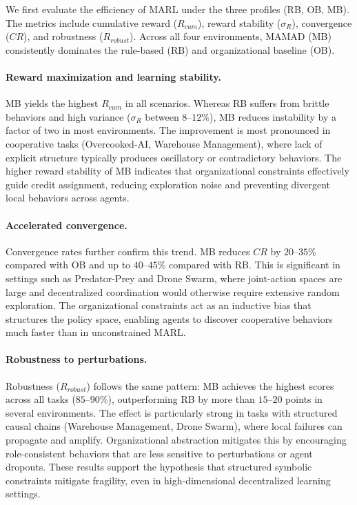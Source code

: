 \documentclass[pdflatex,sn-mathphys-num]{sn-jnl}%
\theoremstyle{thmstyleone}%
\theoremstyle{thmstyletwo}%
\theoremstyle{thmstylethree}%
\begin{document}
We first evaluate the efficiency of MARL under the three profiles (RB, OB, MB).
The metrics include cumulative reward ($R_{cum}$), reward stability ($\sigma_R$),
convergence ($CR$), and robustness ($R_{robust}$). Across all four environments,
MAMAD (MB) consistently dominates the rule-based (RB) and organizational baseline
(OB).

\paragraph*{Reward maximization and learning stability.}
MB yields the highest $R_{cum}$ in all scenarios. Whereas RB suffers from brittle
behaviors and high variance ($\sigma_R$ between $8$--$12\%$), MB reduces
instability by a factor of two in most environments. The improvement is most
pronounced in cooperative tasks (Overcooked-AI, Warehouse Management), where
lack of explicit structure typically produces oscillatory or contradictory
behaviors. The higher reward stability of MB indicates that organizational
constraints effectively guide credit assignment, reducing exploration noise and
preventing divergent local behaviors across agents.

\paragraph*{Accelerated convergence.}
Convergence rates further confirm this trend. MB reduces $CR$ by $20$--$35\%$
compared with OB and up to $40$--$45\%$ compared with RB. This is significant in
settings such as Predator-Prey and Drone Swarm, where joint-action spaces are
large and decentralized coordination would otherwise require extensive random
exploration. The organizational constraints act as an inductive bias that
structures the policy space, enabling agents to discover cooperative behaviors
much faster than in unconstrained MARL.

\paragraph*{Robustness to perturbations.}
Robustness ($R_{robust}$) follows the same pattern: MB achieves the highest
scores across all tasks ($85$--$90\%$), outperforming RB by more than $15$--$20$
points in several environments. The effect is particularly strong in tasks with
structured causal chains (Warehouse Management, Drone Swarm), where local
failures can propagate and amplify. Organizational abstraction mitigates this by
encouraging role-consistent behaviors that are less sensitive to perturbations
or agent dropouts. These results support the hypothesis that structured symbolic
constraints mitigate fragility, even in high-dimensional decentralized learning
settings.
\end{document}
